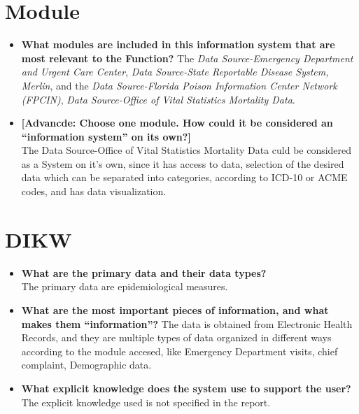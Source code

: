 \documentclass{article}
\begin{document}
\section{Module}
\begin{itemize}
\item{\textbf{What modules are included in this information system that are most relevant to the Function?}}
The \textit{Data Source-Emergency Department and Urgent Care Center}, \textit{Data Source-State Reportable Disease System, Merlin}, and the \textit{Data Source-Florida Poison Information Center Network (FPCIN)}, \textit{Data Source-Office of Vital Statistics Mortality Data}.

\item{\textbf{[Advancde: Choose one module. How could it be considered an “information system” on its own?]}}\\
The Data Source-Office of Vital Statistics Mortality Data culd be considered as a System on it's own, since it has access to data, selection of the desired data which can be separated into categories, according to ICD-10 or ACME codes, and has data visualization.
\end{itemize}

\section{DIKW}
\begin{itemize}
\item{\textbf{What are the primary data and their data types?}}\\
The primary data are epidemiological measures.

\item{\textbf{What are the most important pieces of information, and what makes them “information”?}}
The data is obtained from Electronic Health Records, and they are multiple types of data organized in different ways according to the module accesed, like Emergency Department visits, chief complaint, Demographic data.

\item{\textbf{What explicit knowledge does the system use to support the user?}}\\
The explicit knowledge used is not specified in the report.
\end{itemize}
\pagebreak
\end{document}
